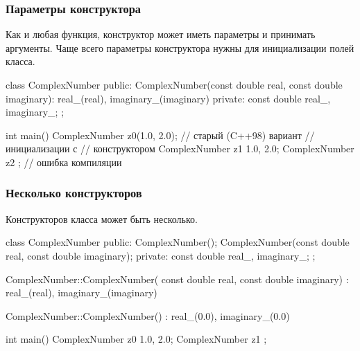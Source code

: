 \documentclass[compress, 8pt]{beamer}
\begin{document}
\begin{frame}[fragile]

    \frametitle{Параметры конструктора}

    \hfill\break
    Как и любая функция, конструктор может иметь параметры и принимать
    аргументы.
    Чаще всего параметры конструктора нужны для инициализации полей класса.

    \begin{myinplacelisting}[minted language=cpp]
class ComplexNumber {
public:
    ComplexNumber(const double real, const double imaginary):
        real_(real), imaginary_(imaginary)
    {}
private:
    const double real_, imaginary_;
};

int main() {
    ComplexNumber z0(1.0, 2.0); // старый (C++98) вариант
                                // инициализации с
                                // конструктором
    ComplexNumber z1 {1.0, 2.0};
    ComplexNumber z2 {}; // ошибка компиляции
}
    \end{myinplacelisting}

\end{frame}

\begin{frame}[fragile]

    \frametitle{Несколько конструкторов}

    \hfill\break
    Конструкторов класса может быть несколько.

    \begin{myinplacelisting}[minted language=cpp]
class ComplexNumber {
public:
    ComplexNumber();
    ComplexNumber(const double real, const double imaginary);
private:
    const double real_, imaginary_;
};

ComplexNumber::ComplexNumber(
    const double real, const double imaginary) :
    real_(real), imaginary_(imaginary)
{}

ComplexNumber::ComplexNumber() :
    real_(0.0), imaginary_(0.0) {}

int main() {
    ComplexNumber z0 {1.0, 2.0};
    ComplexNumber z1 {};
}
    \end{myinplacelisting}

\end{frame}
\end{document}
